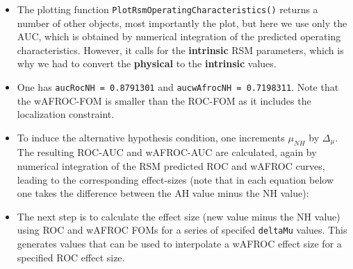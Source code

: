 \documentclass[
]{book}
\begin{document}
\begin{itemize}
\item
  The plotting function \texttt{PlotRsmOperatingCharacteristics()} returns a number of other objects, most importantly the plot, but here we use only the AUC, which is obtained by numerical integration of the predicted operating characteristics. However, it calls for the \textbf{intrinsic} RSM parameters, which is why we had to convert the \textbf{physical} to the \textbf{intrinsic} values.
\item
  One has \texttt{aucRocNH\ =\ 0.8791301} and \texttt{aucwAfrocNH\ =\ 0.7198311}. Note that the wAFROC-FOM is smaller than the ROC-FOM as it includes the localization constraint.
\item
  To induce the alternative hypothesis condition, one increments \(\mu_{NH}\) by \(\Delta_{\mu}\). The resulting ROC-AUC and wAFROC-AUC are calculated, again by numerical integration of the RSM predicted ROC and wAFROC curves, leading to the corresponding effect-sizes (note that in each equation below one takes the difference between the AH value minus the NH value):
\item
  The next step is to calculate the effect size (new value minus the NH value) using ROC and wAFROC FOMs for a series of specifed \texttt{deltaMu} values. This generates values that can be used to interpolate a wAFROC effect size for a specified ROC effect size.
\end{itemize}
\end{document}

